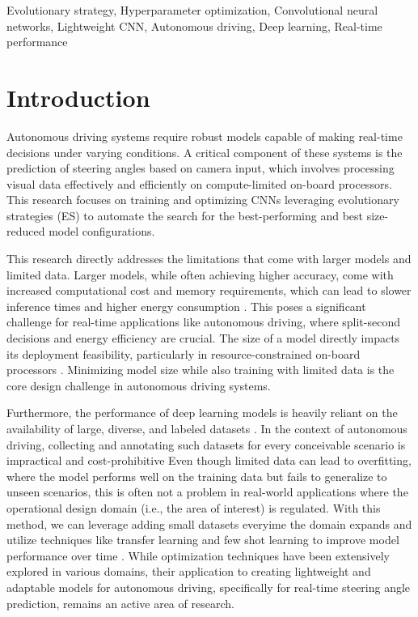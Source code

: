 \documentclass[conference]{IEEEtran}
\begin{document}
\begin{IEEEkeywords}
    Evolutionary strategy, Hyperparameter optimization, Convolutional neural networks, Lightweight CNN, Autonomous driving, Deep learning, Real-time performance
\end{IEEEkeywords}

\section{Introduction}
Autonomous driving systems require robust models capable of making real-time decisions under varying conditions. A critical component of these systems is the prediction of steering angles based on camera input, which involves processing visual data effectively and efficiently on compute-limited on-board processors. This research focuses on training and optimizing CNNs leveraging evolutionary strategies (ES) to automate the search for the best-performing and best size-reduced model configurations.

This research directly addresses the limitations that come with larger models and limited data. Larger models, while often achieving higher accuracy, come with increased computational cost and memory requirements, which can lead to slower inference times and higher energy consumption \cite{b1}. This poses a significant challenge for real-time applications like autonomous driving, where split-second decisions and energy efficiency are crucial. The size of a model directly impacts its deployment feasibility, particularly in resource-constrained on-board processors \cite{b1}. Minimizing model size while also training with limited data is the core design challenge in autonomous driving systems.

Furthermore, the performance of deep learning models is heavily reliant on the availability of large, diverse, and labeled datasets \cite{b1}. In the context of autonomous driving, collecting and annotating such datasets for every conceivable scenario is impractical and cost-prohibitive \cite{b1} Even though limited data can lead to overfitting, where the model performs well on the training data but fails to generalize to unseen scenarios, this is often not a problem in real-world applications where the operational design domain (i.e., the area of interest) is regulated. With this method, we can leverage adding small datasets everyime the domain expands and utilize techniques like transfer learning and few shot learning to improve model performance over time \cite{b1}. While optimization techniques have been extensively explored in various domains, their application to creating lightweight and adaptable models for autonomous driving, specifically for real-time steering angle prediction, remains an active area of research.
\end{document}
